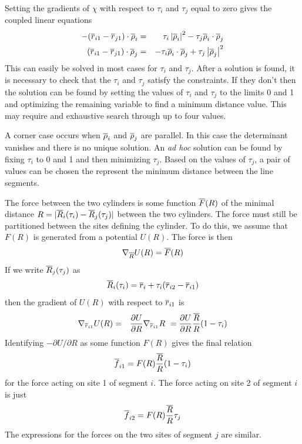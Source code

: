 \documentclass[12pt]{article}
\begin{document}
Setting the gradients of $\chi$ with respect to $\tau_i$ and $\tau_j$ equal to
zero gives the coupled linear equations
\begin{eqnarray*}
-(\overline{r}_{i1}-\overline{r}_{j1})\cdot\overline{\rho}_i & = & \tau_i\left|\overline{\rho}_i\right|^2
                                        - \tau_j\overline{\rho}_i\cdot\overline{\rho}_j \\
(\overline{r}_{i1}-\overline{r}_{j1})\cdot\overline{\rho}_j & = & - \tau_i\overline{\rho}_i\cdot\overline{\rho}_j
                                       + \tau_j\left|\overline{\rho}_j\right|^2
\end{eqnarray*}
This can easily be solved in most cases for $\tau_i$ and $\tau_j$.
After a solution is found, it is necessary to check that the $\tau_i$ and $\tau_j$
satisfy the constraints. If they don't then the solution can be found by setting the
values of $\tau_i$ and $\tau_j$ to the limits 0 and 1 and optimizing the remaining
variable to find a minimum distance value. This may require and exhaustive search through
up to four values.

A corner case occurs when $\overline{\rho}_i$ and $\overline{\rho}_j$ are parallel. In this case the
determinant vanishes and there is no unique solution. An {\em ad hoc} solution can be
found by fixing $\tau_i$ to 0 and 1 and then minimizing $\tau_j$. Based on the values
of $\tau_j$, a pair of values can be chosen the represent the minimum distance between
the line segments.

The force between the two cylinders is some function $\overline{F}(R)$ of the minimal
distance $R=|\overline{R}_i(\tau_i)-\overline{R}_j(\tau_j)|$ between the two cylinders. The
force must still be partitioned between the sites defining the cylinder. To do
this, we assume that $F(R)$ is generated from a potential $U(R)$. The force is
then
\[
\nabla_{\overline{R}}U(R) = \overline{F}(R)
\]
If we write $\overline{R}_j(\tau_j)$ as
\[
\overline{R}_i(\tau_i) = \overline{r}_i + \tau_i (\overline{r}_{i2}-\overline{r}_{i1})
\]
then the gradient of $U(R)$ with respect to $\overline{r}_{i1}$ is
\begin{eqnarray*}
\nabla_{\overline{r}_{i1}}U(R) & = & \frac{\partial U}{\partial R}\nabla_{\overline{r}_{i1}}R\
 = \frac{\partial U}{\partial R}\frac{\overline{R}}{R} (1-\tau_i)
\end{eqnarray*}
Identifying $-\partial U/\partial R$ as some function $F(R)$ gives the final
relation
\[
\overline{f}_{i1} = F(R)\frac{\overline{R}}{R}(1-\tau_i)
\]
for the force acting on site 1 of segment $i$. The force acting on site 2 of segment
$i$ is just
\[
\overline{f}_{i2} = F(R)\frac{\overline{R}}{R}\tau_j
\]
The expressions for the forces on the two sites of segment $j$ are similar.


\end{document}
